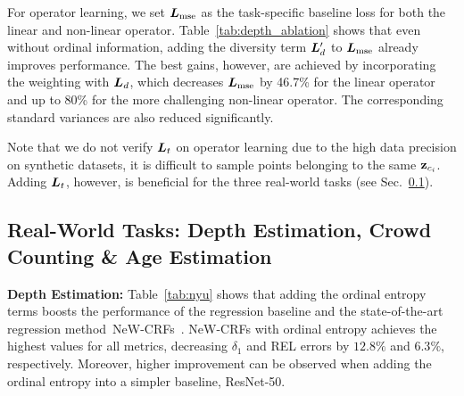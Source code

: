 \documentclass{article} %
\newcommand{\AY}[1]{{\color{purple} {\bf (AY: #1)}}}
\begin{document}
For operator learning, we set ${\bm{L}}_{\text{mse}}$ as the task-specific baseline loss for both the linear and non-linear operator. Table~\ref{tab:depth_ablation} shows that even without ordinal information, adding the diversity term \ie ${\bm{L}}'_d$ to  ${\bm{L}}_\text{mse}$ already improves performance.  The best gains, however, are achieved by incorporating the weighting with ${\bm{L}}_d$, which decreases %
${\bm{L}}_{\text{mse}}$ by 46.7\% for the linear operator and up to 80\% for the more challenging non-linear operator. The corresponding standard variances are also reduced significantly. 

Note that we do not verify ${\bm{L}}_t$ on operator learning due to the 
high data precision on synthetic datasets, it is difficult to sample points belonging to the same ${\bf z}_{c_i}$. Adding ${\bm{L}}_t$, however, is beneficial for the three real-world tasks (see Sec.~\ref{subsection_depth}).  

\subsection{Real-World Tasks: Depth Estimation, Crowd Counting \& Age Estimation}
\label{subsection_depth}

\textbf{Depth Estimation:} 
Table~\ref{tab:nyu} shows that adding the ordinal entropy terms boosts the performance of the regression baseline and the state-of-the-art regression method~NeW-CRFs~\citep{yuan2022new}.  %
NeW-CRFs with ordinal entropy achieves the highest values for all metrics, decreasing $\delta_1$ and REL errors by $12.8\%$ and $6.3\%$, respectively.
Moreover, higher improvement can be observed when adding the ordinal entropy into a simpler baseline, \ie ResNet-50.
\end{document}

